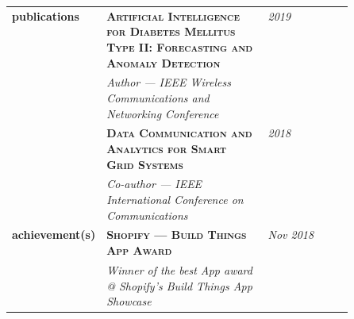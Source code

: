 \documentclass{article}
\begin{document}
\begin{longtable}{@{}>{\raggedleft}p{0.25\linewidth}
                          p{}>{}p{0.25\linewidth}@{}}
        \textbf{publications}
            & \textbf{\textsc{Artificial Intelligence for Diabetes Mellitus Type II: Forecasting and Anomaly Detection}} & \textit{2019}\\
            & \textit{Author --- IEEE Wireless Communications and Networking Conference}  \\ [1em]

            & \textbf{\textsc{Data Communication and Analytics for Smart Grid Systems}} & \textit{2018}\\
            & \textit{Co-author --- IEEE International Conference on Communications}\\ [1em]

        \textbf{achievement(s)}
            & \textbf{\textsc{Shopify --- Build Things App Award}} & \textit{Nov 2018} \\
            & \textit{Winner of the best App award @ Shopify's Build Things App Showcase} \\ [1em]

  \end{longtable}
\end{document}
